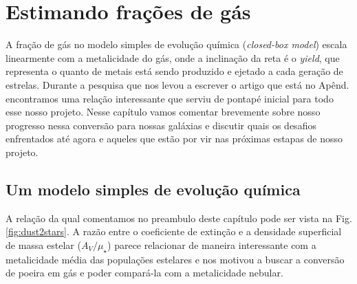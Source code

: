 



\chapter{Estimando frações de gás}
\label{sec:gasfrac}

A fração de gás no modelo simples de evolução química ({\em closed-box model}) escala linearmente
com a metalicidade do gás, onde a inclinação da reta é o {\em yield}, que representa o quanto de
metais está sendo produzido e ejetado a cada geração de estrelas. Durante a pesquisa que nos levou a
escrever o artigo que está no Apênd. \label{apendice:GDetal2014b} encontramos uma relação
interessante que serviu de pontapé inicial para todo esse nosso projeto. Nesse capítulo vamos
comentar brevemente sobre nosso progresso nessa conversão para nossas galáxias e discutir quais os
desafios enfrentados até agora e aqueles que estão por vir nas próximas estapas de nosso projeto.

\section{Um modelo simples de evolução química}
\label{sec:gasfrac:closedbox}

A relação da qual comentamos no preambulo deste capítulo pode ser vista na Fig.
\ref{fig:dust2stars}. A razão entre o coeficiente de extinção e a densidade superficial de massa
estelar ($A_V / \mu_\star$) parece relacionar de maneira interessante com a metalicidade média das
populações estelares e nos motivou a buscar a conversão de poeira em gás e poder compará-la com a
metalicidade nebular.

